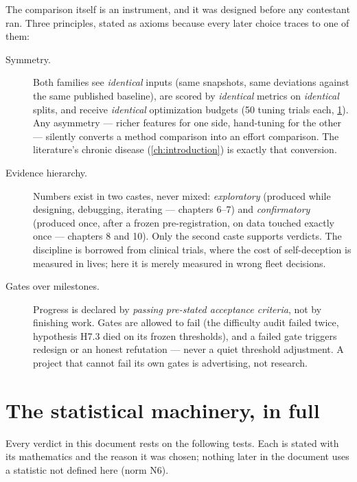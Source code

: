 The comparison itself is an instrument, and it was designed before any contestant ran.
Three principles, stated as axioms because every later choice traces to one of them:

\begin{description}
  \item[Symmetry.] Both families see \emph{identical} inputs (same snapshots, same
    deviations against the same published baseline), are scored by \emph{identical}
    metrics on \emph{identical} splits, and receive \emph{identical} optimization
    budgets (50 tuning trials each, \cref{sec:stats-math}). Any asymmetry --- richer
    features for one side, hand-tuning for the other --- silently converts a method
    comparison into an effort comparison. The literature's chronic disease
    (\cref{ch:introduction}) is exactly that conversion.
  \item[Evidence hierarchy.] Numbers exist in two castes, never mixed: \emph{exploratory}
    (produced while designing, debugging, iterating --- chapters 6--7) and
    \emph{confirmatory} (produced once, after a frozen pre-registration, on data touched
    exactly once --- chapters 8 and 10). Only the second caste supports verdicts. The
    discipline is borrowed from clinical trials, where the cost of self-deception is
    measured in lives; here it is merely measured in wrong fleet decisions.
  \item[Gates over milestones.] Progress is declared by \emph{passing pre-stated
    acceptance criteria}, not by finishing work. Gates are allowed to fail (the
    difficulty audit failed twice, hypothesis H7.3 died on its frozen thresholds), and a
    failed gate triggers redesign or an honest refutation --- never a quiet threshold
    adjustment. A project that cannot fail its own gates is advertising, not research.
\end{description}

\section{The statistical machinery, in full}
\label{sec:stats-math}

Every verdict in this document rests on the following tests. Each is stated with its
mathematics and the reason it was chosen; nothing later in the document uses a statistic
not defined here (norm N6).

